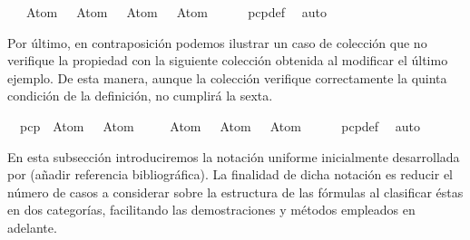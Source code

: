 \begin{isabellebody}
\ \ {\isacharbraceleft}{\isacharparenleft}{\isacharparenleft}\isactrlbold {\isasymnot}\ {\isacharparenleft}Atom\ {}{\isacharparenright}{\isacharparenright}\ \isactrlbold {\isasymrightarrow}\ Atom\ {}{\isacharparenright}{\isacharcomma}\ \isactrlbold {\isasymnot}{\isacharparenleft}\isactrlbold {\isasymnot}\ {\isacharparenleft}Atom\ {}{\isacharparenright}{\isacharparenright}{\isacharcomma}\ \ Atom\ {}{\isacharbraceright}{\isacharbraceright}{\isachardoublequoteclose}\ \isanewline
%
\isadelimproof
\ \ %
\endisadelimproof
%
\isatagproof
{}\isamarkupfalse%
\ pcp{\isacharunderscore}def\ \isamarkupfalse%
\ auto%
\endisatagproof
{\isafoldproof}%
%
\isadelimproof
%
\endisadelimproof
%
\begin{isamarkuptext}%
Por último, en contraposición podemos ilustrar un caso de colección que no verifique la 
  propiedad con la siguiente colección obtenida al modificar el último ejemplo. De
  esta manera, aunque la colección verifique correctamente la quinta condición de la
  definición, no cumplirá la sexta.%
\end{isamarkuptext}\isamarkuptrue%
\isamarkupfalse%
\ {\isachardoublequoteopen}{\isasymnot}\ pcp\ {\isacharbraceleft}{\isacharbraceleft}{\isacharparenleft}\isactrlbold {\isasymnot}\ {\isacharparenleft}Atom\ {}{\isacharparenright}{\isacharparenright}\ \isactrlbold {\isasymrightarrow}\ Atom\ {}{\isacharbraceright}{\isacharcomma}\isanewline
\ \ \ {\isacharbraceleft}{\isacharparenleft}{\isacharparenleft}\isactrlbold {\isasymnot}\ {\isacharparenleft}Atom\ {}{\isacharparenright}{\isacharparenright}\ \isactrlbold {\isasymrightarrow}\ Atom\ {}{\isacharparenright}{\isacharcomma}\ \isactrlbold {\isasymnot}{\isacharparenleft}\isactrlbold {\isasymnot}\ {\isacharparenleft}Atom\ {}{\isacharparenright}{\isacharparenright}{\isacharbraceright}{\isacharbraceright}{\isachardoublequoteclose}\ \isanewline
%
\isadelimproof
\ \ %
\endisadelimproof
%
\isatagproof
{}\isamarkupfalse%
\ pcp{\isacharunderscore}def\ \isamarkupfalse%
\ auto%
\endisatagproof
{\isafoldproof}%
%
\isadelimproof
%
\endisadelimproof
%
\isadelimdocument
%
\endisadelimdocument
%
\isatagdocument
%
\isamarkuptrue%
%
\endisatagdocument
{\isafolddocument}%
%
\isadelimdocument
%
\endisadelimdocument
%
\begin{isamarkuptext}%
En esta subsección introduciremos la notación uniforme inicialmente 
  desarrollada por  (añadir referencia bibliográfica). La finalidad
  de dicha notación es reducir el número de casos a considerar sobre la estructura de 
  las fórmulas al clasificar éstas en dos categorías, facilitando las demostraciones
  y métodos empleados en adelante.


\end{isamarkuptext}
\end{isabellebody}
